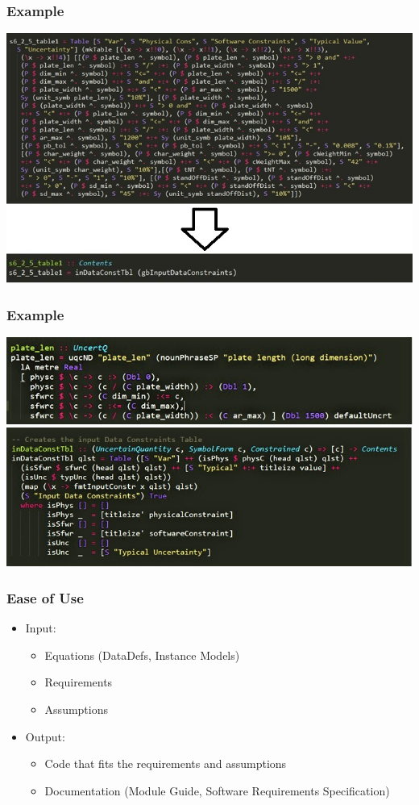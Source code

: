 \documentclass{beamer}
\begin{document}
\begin{frame}
\frametitle{Example}
\includegraphics[scale=0.60]{CodeComparisons.jpg}
\end{frame}

\begin{frame}
\frametitle{Example}
\centering
\includegraphics[height=0.25\textheight]{ChunkEx.jpg}
\includegraphics[height=0.40\textheight]{inDataConstTbl.jpg}
\end{frame}


\begin{frame}
\frametitle{Ease of Use}
\begin{itemize}
 \item<1-> Input:
  \begin{itemize}
   \item<2-> Equations (DataDefs, Instance Models)
   \item<3-> Requirements
   \item<4-> Assumptions
  \end{itemize}
 \item<5-> Output:
  \begin{itemize}
   \item<6-> Code that fits the requirements and assumptions
   \item<7-> Documentation (Module Guide, Software Requirements Specification)
  \end{itemize}
\end{itemize}
\end{frame}
\end{document}

